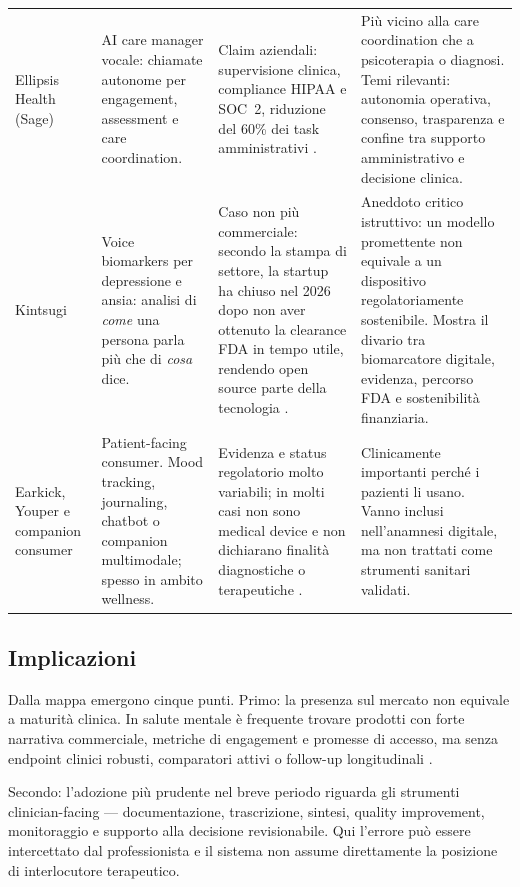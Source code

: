 \documentclass[11pt,a4paper]{article}
\begin{document}
\begin{longtable}{>{\RaggedRight}p{2.2cm} >{\RaggedRight}p{3.4cm} >{\RaggedRight}p{4.0cm} >{\RaggedRight}p{4.0cm}}
\addlinespace
\small Ellipsis Health (Sage) & \small AI care manager vocale: chiamate autonome per engagement, assessment e care coordination. & \small Claim aziendali: supervisione clinica, compliance HIPAA e SOC~2, riduzione del 60\% dei task amministrativi \cite{ellipsis}. & \small Più vicino alla care coordination che a psicoterapia o diagnosi. Temi rilevanti: autonomia operativa, consenso, trasparenza e confine tra supporto amministrativo e decisione clinica. \\
\addlinespace
\small Kintsugi & \small Voice biomarkers per depressione e ansia: analisi di \emph{come} una persona parla più che di \emph{cosa} dice. & \small Caso non più commerciale: secondo la stampa di settore, la startup ha chiuso nel 2026 dopo non aver ottenuto la clearance FDA in tempo utile, rendendo open source parte della tecnologia \cite{verge2026}. & \small Aneddoto critico istruttivo: un modello promettente non equivale a un dispositivo regolatoriamente sostenibile. Mostra il divario tra biomarcatore digitale, evidenza, percorso FDA e sostenibilità finanziaria. \\
\addlinespace
\small Earkick, Youper e companion consumer & \small Patient-facing consumer. Mood tracking, journaling, chatbot o companion multimodale; spesso in ambito wellness. & \small Evidenza e status regolatorio molto variabili; in molti casi non sono medical device e non dichiarano finalità diagnostiche o terapeutiche \cite{ap2024}. & \small Clinicamente importanti perché i pazienti li usano. Vanno inclusi nell'anamnesi digitale, ma non trattati come strumenti sanitari validati. \\
\end{longtable}

\subsection{Implicazioni}

Dalla mappa emergono cinque punti. Primo: la presenza sul mercato non equivale a maturità clinica. In salute mentale è frequente trovare prodotti con forte narrativa commerciale, metriche di engagement e promesse di accesso, ma senza endpoint clinici robusti, comparatori attivi o follow-up longitudinali \cite{li2023,ap2024}.

Secondo: l'adozione più prudente nel breve periodo riguarda gli strumenti clinician-facing --- documentazione, trascrizione, sintesi, quality improvement, monitoraggio e supporto alla decisione revisionabile. Qui l'errore può essere intercettato dal professionista e il sistema non assume direttamente la posizione di interlocutore terapeutico.
\end{document}
